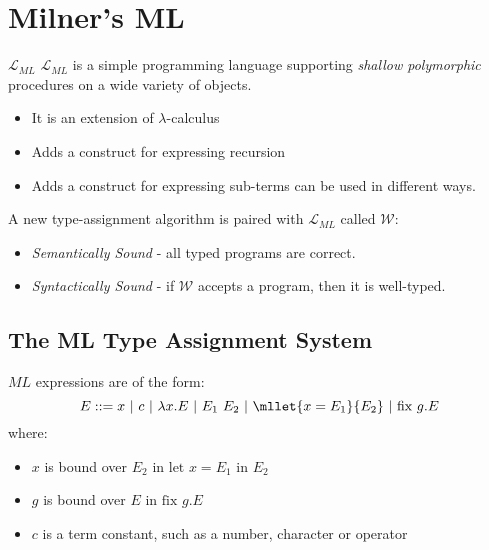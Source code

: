 
\chapter{Milner's ML}
\begin{definitionbox}{$\mathcal{L}_{ML}$}
    $\mathcal{L}_{ML}$ is a simple programming language supporting \textit{shallow polymorphic} procedures on a wide variety of objects.
    \begin{itemize}
        \item It is an extension of $\lambda$-calculus
        \item Adds a construct for expressing recursion
        \item Adds a construct for expressing sub-terms can be used in different ways.
    \end{itemize}
\end{definitionbox}

A new type-assignment algorithm is paired with $\mathcal{L}_{ML}$ called $\mathcal{W}$:
\begin{itemize}
    \item \textit{Semantically Sound} - all typed programs are correct.
    \item \textit{Syntactically Sound} - if $\mathcal{W}$ accepts a program, then it is well-typed.
\end{itemize}

\section{The ML Type Assignment System}
$ML$ expressions are of the form:
\[E ::= x \ | \ c \ | \ \lambda x.E \ | \ E_1 \ E_2 \ | \ \mllet{x = E_1}{E_2} \ | \ \text{fix }g . E\]
where:
\begin{itemize}
    \item $x$ is bound over $E_2$ in $\text{let }x = E_1 \text{ in } E_2$
    \item $g$ is bound over $E$ in $\text{fix }g . E$
    \item $c$ is a term constant, such as a number, character or operator
\end{itemize}
